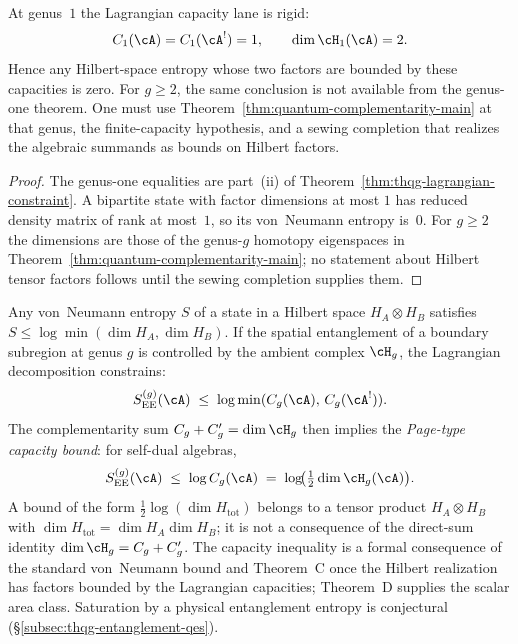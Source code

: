 \begin{proposition}
\label{prop:thqg-genus-one-higher-genus-scope}
At genus~$1$ the Lagrangian capacity lane is rigid:
\[
C_1(\cA)=C_1(\cA^!)=1,\qquad \dim\cH_1(\cA)=2 .
\]
Hence any Hilbert-space entropy whose two factors are bounded by
these capacities is zero.  For $g\ge2$, the same conclusion is not
available from the genus-one theorem.  One must use
Theorem~\ref{thm:quantum-complementarity-main} at that genus, the
finite-capacity hypothesis, and a sewing completion that realizes the
algebraic summands as bounds on Hilbert factors.
\end{proposition}

\begin{proof}
The genus-one equalities are part~\textup{(ii)} of
Theorem~\ref{thm:thqg-lagrangian-constraint}.  A bipartite state with
factor dimensions at most $1$ has reduced density matrix of rank at
most~$1$, so its von~Neumann entropy is~$0$.  For $g\ge2$ the
dimensions are those of the genus-$g$ homotopy eigenspaces in
Theorem~\ref{thm:quantum-complementarity-main}; no statement about
Hilbert tensor factors follows until the sewing completion supplies
them.
\end{proof}

\begin{remark}
\label{rem:thqg-capacity-bounds-entanglement}
Any von~Neumann entropy $S$ of a state in a Hilbert space
$H_A \otimes H_B$ satisfies $S \le \log\min(\dim H_A, \dim H_B)$.
If the spatial entanglement of a boundary subregion at genus $g$
is controlled by the ambient complex $\cH_g$, the Lagrangian
decomposition constrains:
\[
S_{\mathrm{EE}}^{(g)}(\cA)
\;\le\;
\log\min(C_g(\cA),\, C_g(\cA^!)).
\]
The complementarity sum $C_g + C_g' = \dim\cH_g$ then implies
the \emph{Page-type capacity bound}: for self-dual algebras,
\[
S_{\mathrm{EE}}^{(g)}(\cA)
\;\le\;
\log C_g(\cA)
\;=\;
\log\!\bigl(\tfrac{1}{2}\dim\cH_g(\cA)\bigr).
\]
A bound of the form $\tfrac12\log(\dim H_{\mathrm{tot}})$ belongs
to a tensor product $H_A\otimes H_B$ with
$\dim H_{\mathrm{tot}}=\dim H_A\dim H_B$; it is not a consequence
of the direct-sum identity $\dim\cH_g=C_g+C_g'$.
The capacity inequality is a formal consequence of the standard
von~Neumann bound and Theorem~C once the Hilbert realization has
factors bounded by the Lagrangian capacities; Theorem~D supplies the
scalar area class.  Saturation by a physical entanglement entropy is
conjectural (\S\ref{subsec:thqg-entanglement-qes}).
\end{remark}

